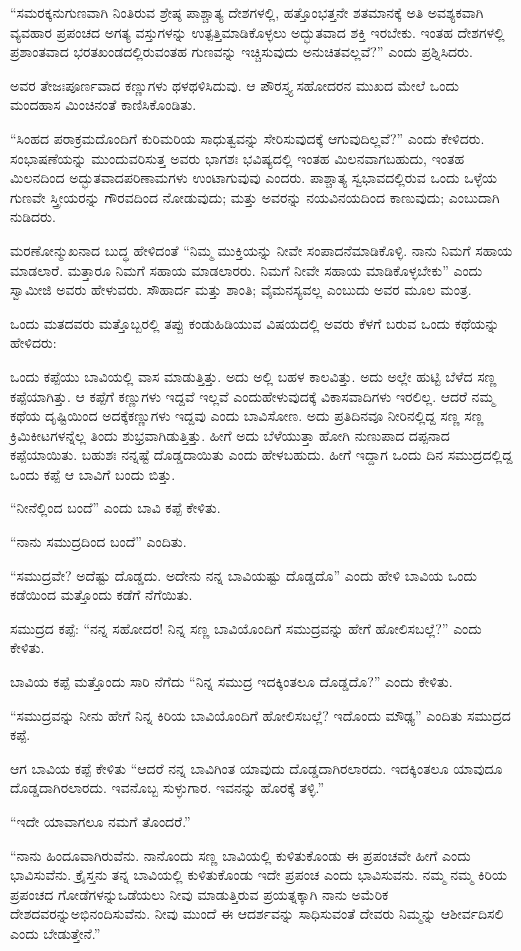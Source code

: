 “ಸಮರಕ್ಕನುಗುಣವಾಗಿ ನಿಂತಿರುವ ಶ್ರೇಷ್ಠ ಪಾಶ್ಚಾತ್ಯ ದೇಶಗಳಲ್ಲಿ, ಹತ್ತೊಂಭತ್ತನೇ ಶತಮಾನಕ್ಕೆ ಅತಿ ಅವಶ್ಯಕವಾಗಿ ವ್ಯವಹಾರ ಪ್ರಪಂಚದ ಅಗತ್ಯ ವಸ್ತುಗಳನ್ನು ಉತ್ಪತ್ತಿಮಾಡಿಕೊಳ್ಳಲು ಅದ್ಭುತವಾದ ಶಕ್ತಿ ಇರಬೇಕು. ಇಂತಹ ದೇಶಗಳಲ್ಲಿ ಪ್ರಶಾಂತವಾದ ಭರತಖಂಡದಲ್ಲಿರುವಂತಹ ಗುಣವನ್ನು ಇಚ್ಚಿಸುವುದು ಅನುಚಿತವಲ್ಲವೆ?” ಎಂದು ಪ್ರಶ್ನಿಸಿದರು.

ಅವರ ತೇಜಃಪೂರ್ಣವಾದ ಕಣ್ಣುಗಳು ಥಳಥಳಿಸಿದುವು. ಆ ಪೌರಸ್ತ್ಯ ಸಹೋದರನ ಮುಖದ ಮೇಲೆ ಒಂದು ಮಂದಹಾಸ ಮಿಂಚಿನಂತೆ ಕಾಣಿಸಿಕೊಂಡಿತು.

“ಸಿಂಹದ ಪರಾಕ್ರಮದೊಂದಿಗೆ ಕುರಿಮರಿಯ ಸಾಧುತ್ವವನ್ನು ಸೇರಿಸುವುದಕ್ಕೆ ಆಗುವುದಿಲ್ಲವೆ?” ಎಂದು ಕೇಳಿದರು. ಸಂಭಾಷಣೆಯನ್ನು ಮುಂದುವರಿಸುತ್ತ ಅವರು ಭಾಗಶಃ ಭವಿಷ್ಯದಲ್ಲಿ ಇಂತಹ ಮಿಲನವಾಗಬಹುದು, ಇಂತಹ ಮಿಲನದಿಂದ ಅದ್ಭುತವಾದ\break ಪರಿಣಾಮಗಳು ಉಂಟಾಗುವುವು ಎಂದರು. ಪಾಶ್ಚಾತ್ಯ ಸ್ವಭಾವದಲ್ಲಿರುವ ಒಂದು ಒಳ್ಳೆಯ ಗುಣವೇ ಸ್ತ್ರೀಯರನ್ನು ಗೌರವದಿಂದ ನೋಡುವುದು; ಮತ್ತು ಅವರನ್ನು ನಯವಿನಯದಿಂದ ಕಾಣುವುದು; ಎಂಬುದಾಗಿ ನುಡಿದರು.

ಮರಣೋನ್ಮುಖನಾದ ಬುದ್ಧ ಹೇಳಿದಂತೆ “ನಿಮ್ಮ ಮುಕ್ತಿಯನ್ನು ನೀವೇ ಸಂಪಾದನೆ\break ಮಾಡಿಕೊಳ್ಳಿ. ನಾನು ನಿಮಗೆ ಸಹಾಯ ಮಾಡಲಾರೆ. ಮತ್ತಾರೂ ನಿಮಗೆ ಸಹಾಯ ಮಾಡಲಾರರು. ನಿಮಗೆ ನೀವೇ ಸಹಾಯ ಮಾಡಿಕೊಳ್ಳಬೇಕು” ಎಂದು ಸ್ವಾಮೀಜಿ ಅವರು ಹೇಳುವರು. ಸೌಹಾರ್ದ ಮತ್ತು ಶಾಂತಿ; ವೈಮನಸ್ಯವಲ್ಲ ಎಂಬುದು ಅವರ ಮೂಲ ಮಂತ್ರ.

ಒಂದು ಮತದವರು ಮತ್ತೊಬ್ಬರಲ್ಲಿ ತಪ್ಪು ಕಂಡುಹಿಡಿಯುವ ವಿಷಯದಲ್ಲಿ ಅವರು ಕೆಳಗೆ ಬರುವ ಒಂದು ಕಥೆಯನ್ನು ಹೇಳಿದರು:

ಒಂದು ಕಪ್ಪೆಯು ಬಾವಿಯಲ್ಲಿ ವಾಸ ಮಾಡುತ್ತಿತ್ತು. ಅದು ಅಲ್ಲಿ ಬಹಳ ಕಾಲವಿತ್ತು. ಅದು ಅಲ್ಲೇ ಹುಟ್ಟಿ ಬೆಳೆದ ಸಣ್ಣ ಕಪ್ಪೆಯಾಗಿತ್ತು. ಆ ಕಪ್ಪೆಗೆ ಕಣ್ಣುಗಳು ಇದ್ದವೆ ಇಲ್ಲವೆ ಎಂದು\break ಹೇಳುವುದಕ್ಕೆ ವಿಕಾಸವಾದಿಗಳು ಇರಲಿಲ್ಲ. ಆದರೆ ನಮ್ಮ ಕಥೆಯ ದೃಷ್ಟಿಯಿಂದ ಅದಕ್ಕೆ\break ಕಣ್ಣುಗಳು ಇದ್ದವು ಎಂದು ಬಾವಿಸೋಣ. ಅದು ಪ್ರತಿದಿನವೂ ನೀರಿನಲ್ಲಿದ್ದ ಸಣ್ಣ ಸಣ್ಣ ಕ್ರಿಮಿಕೀಟಗಳನ್ನೆಲ್ಲ ತಿಂದು ಶುಭ್ರವಾಗಿಡುತ್ತಿತ್ತು. ಹೀಗೆ ಅದು ಬೆಳೆಯುತ್ತಾ ಹೋಗಿ ನುಣುಪಾದ ದಪ್ಪನಾದ ಕಪ್ಪೆಯಾಯಿತು. ಬಹುಶಃ ನನ್ನಷ್ಟೆ ದೊಡ್ಡದಾಯಿತು ಎಂದು ಹೇಳಬಹುದು. ಹೀಗೆ ಇದ್ದಾಗ ಒಂದು ದಿನ ಸಮುದ್ರದಲ್ಲಿದ್ದ ಒಂದು ಕಪ್ಪೆ ಆ ಬಾವಿಗೆ ಬಂದು ಬಿತ್ತು.

“ನೀನೆಲ್ಲಿಂದ ಬಂದೆ” ಎಂದು ಬಾವಿ ಕಪ್ಪೆ ಕೇಳಿತು.

“ನಾನು ಸಮುದ್ರದಿಂದ ಬಂದೆ” ಎಂದಿತು.

“ಸಮುದ್ರವೇ? ಅದೆಷ್ಟು ದೊಡ್ಡದು. ಅದೇನು ನನ್ನ ಬಾವಿಯಷ್ಟು ದೊಡ್ಡದೊ” ಎಂದು ಹೇಳಿ ಬಾವಿಯ ಒಂದು ಕಡೆಯಿಂದ ಮತ್ತೊಂದು ಕಡೆಗೆ ನೆಗೆಯಿತು.

ಸಮುದ್ರದ ಕಪ್ಪೆ: “ನನ್ನ ಸಹೋದರ! ನಿನ್ನ ಸಣ್ಣ ಬಾವಿಯೊಂದಿಗೆ ಸಮುದ್ರವನ್ನು ಹೇಗೆ ಹೋಲಿಸಬಲ್ಲೆ?” ಎಂದು ಕೇಳಿತು.

ಬಾವಿಯ ಕಪ್ಪೆ ಮತ್ತೊಂದು ಸಾರಿ ನೆಗೆದು “ನಿನ್ನ ಸಮುದ್ರ ಇದಕ್ಕಿಂತಲೂ ದೊಡ್ಡದೊ?” ಎಂದು ಕೇಳಿತು.

“ಸಮುದ್ರವನ್ನು ನೀನು ಹೇಗೆ ನಿನ್ನ ಕಿರಿಯ ಬಾವಿಯೊಂದಿಗೆ ಹೋಲಿಸಬಲ್ಲೆ? ಇದೊಂದು ಮೌಢ್ಯ” ಎಂದಿತು ಸಮುದ್ರದ ಕಪ್ಪೆ.

ಆಗ ಬಾವಿಯ ಕಪ್ಪೆ ಕೇಳಿತು “ಆದರೆ ನನ್ನ ಬಾವಿಗಿಂತ ಯಾವುದು ದೊಡ್ಡದಾಗಿರಲಾರದು. ಇದಕ್ಕಿಂತಲೂ ಯಾವುದೂ ದೊಡ್ಡದಾಗಿರಲಾರದು. ಇವನೊಬ್ಬ ಸುಳ್ಳುಗಾರ. ಇವನನ್ನು ಹೊರಕ್ಕೆ ತಳ್ಳಿ.”

“ಇದೇ ಯಾವಾಗಲೂ ನಮಗೆ ತೊಂದರೆ.”

“ನಾನು ಹಿಂದೂವಾಗಿರುವೆನು. ನಾನೊಂದು ಸಣ್ಣ ಬಾವಿಯಲ್ಲಿ ಕುಳಿತುಕೊಂಡು ಈ ಪ್ರಪಂಚವೇ ಹೀಗೆ ಎಂದು ಭಾವಿಸುವೆನು. ಕ್ರೈಸ್ತನು ತನ್ನ ಬಾವಿಯಲ್ಲಿ ಕುಳಿತುಕೊಂಡು ಇದೇ ಪ್ರಪಂಚ ಎಂದು ಭಾವಿಸುವನು. ನಮ್ಮ ನಮ್ಮ ಕಿರಿಯ ಪ್ರಪಂಚದ ಗೋಡೆಗಳನ್ನು\break ಒಡೆಯಲು ನೀವು ಮಾಡುತ್ತಿರುವ ಪ್ರಯತ್ನಕ್ಕಾಗಿ ನಾನು ಅಮೆರಿಕ ದೇಶದವರನ್ನು\break ಅಭಿನಂದಿಸುವೆನು. ನೀವು ಮುಂದೆ ಈ ಆದರ್ಶವನ್ನು ಸಾಧಿಸುವಂತೆ ದೇವರು ನಿಮ್ಮನ್ನು ಆಶೀರ್ವದಿಸಲಿ ಎಂದು ಬೇಡುತ್ತೇನೆ.”

